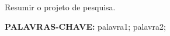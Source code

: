 \documentclass[../Main.tex]{subfiles}
\begin{document}
   Resumir o projeto de pesquisa.
   
   \noindent
   \textbf{PALAVRAS-CHAVE:} palavra1; palavra2;
   
\end{document}
